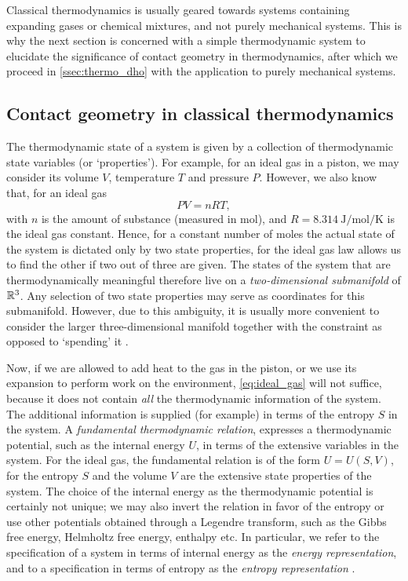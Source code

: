 Classical thermodynamics is usually geared towards systems containing expanding gases or chemical mixtures, and not purely mechanical systems. This is why the next section is concerned with a simple thermodynamic system to elucidate the significance of contact geometry in thermodynamics, after which we proceed in \cref{ssec:thermo_dho} with the application to purely mechanical systems.

\subsection{Contact geometry in classical thermodynamics} 
The thermodynamic state of a system is given by a collection of thermodynamic state variables (or `properties'). For example, for an ideal gas in a piston, we may consider its volume $V$, temperature $T$ and pressure $P$. However, we also know that, for an ideal gas
\begin{equation}
    PV = nRT,
    \label{eq:ideal_gas}
\end{equation}
with $n$ is the amount of substance (measured in \si{\mole}), and $R = \SI{8.314}{\joule \per \mole \per \kelvin}$ is the ideal gas constant.  Hence, for a constant number of moles the actual state of the system is dictated only by two state properties, for the ideal gas law allows us to find the other if two out of three are given. The states of the system that are thermodynamically meaningful therefore live on a \emph{two-dimensional submanifold} of $\mathbb{R}^3$. Any selection of two state properties may serve as coordinates for this submanifold. However, due to this ambiguity, it is usually more convenient to consider the larger three-dimensional manifold together with the constraint as opposed to `spending' it \cite{Balian2001, Giancoli2014}.

Now, if we are allowed to add heat to the gas in the piston, or we use its expansion to perform work on the environment, \cref{eq:ideal_gas} will not suffice, because it does not contain \emph{all} the thermodynamic information of the system. The additional information is supplied (for example) in terms of the entropy $S$ in the system. A \emph{fundamental thermodynamic relation}, expresses a thermodynamic potential, such as the internal energy $U$, in terms of the extensive variables in the system. For the ideal gas, the fundamental relation is of the form $U = U(S, V)$, for the entropy $S$ and the volume $V$ are the extensive state properties of the system. The choice of the internal energy as the thermodynamic potential is certainly not unique; we may also invert the relation in favor of the entropy or use other potentials obtained through a Legendre transform, such as the Gibbs free energy, Helmholtz free energy, enthalpy etc. In particular, we refer to the specification of a system in terms of internal energy as the \emph{energy representation}, and to a specification in terms of entropy as the \emph{entropy representation} \cite{VanderSchaft2021a}.

